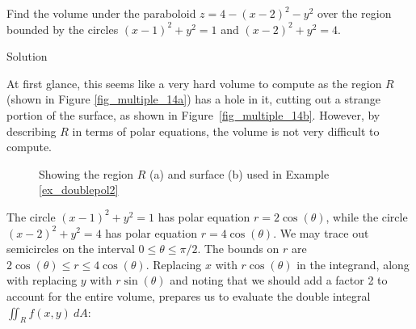 \begin{example}\label{ex_doublepol2}
Find the volume under the paraboloid $z=4-(x-2)^2-y^2$ over the region bounded by the circles $(x-1)^2+y^2=1$ and $(x-2)^2+y^2=4$.

Solution 

At first glance, this seems like a very hard volume to compute as the region $R$ (shown in Figure \ref{fig_multiple_14a}) has a hole in it, cutting out a strange portion of the surface, as shown in Figure~\ref{fig_multiple_14b}. However, by describing $R$ in terms of polar equations, the volume is not very difficult to compute.


\begin{figure}[H]
\centering
\qquad
{}
\caption{Showing the region $R$ (a) and surface (b) used in Example \ref{ex_doublepol2}}
\end{figure}



The circle $(x-1)^2+y^2=1$ has polar equation $r=2\cos(\theta)$, while the circle $(x-2)^2+y^2=4$ has polar equation $r=4\cos(\theta)$. We may trace out semicircles on the interval $0\leq\theta\leq\pi/2$. The bounds on $r$ are $2\cos(\theta)\leq r\leq 4\cos(\theta).$ Replacing $x$ with $r\cos(\theta)$ in the integrand, along with replacing $y$ with $r\sin(\theta)$ and noting that we should add a factor 2 to account for the entire volume, prepares us to evaluate the double integral $\iint_Rf(x,y)\ dA$:


\end{example}
